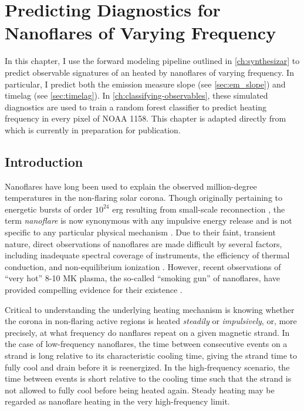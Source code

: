 \chapter{Predicting Diagnostics for Nanoflares of Varying Frequency}\label{ch:modeling-observables}

In this chapter, I use the forward modeling pipeline outlined in \autoref{ch:synthesizar} to predict observable signatures of an \AR{} heated by nanoflares of varying frequency. In particular, I predict both the emission measure slope (see \autoref{sec:em_slope}) and timelag (see \autoref{sec:timelag}). In \autoref{ch:classifying-observables}, these simulated diagnostics are used to train a random forest classifier to predict heating frequency in every pixel of \AR{} NOAA 1158. This chapter is adapted directly from \citet{barnes_understanding_2019} which is currently in preparation for publication. 

\section{Introduction}\label{sec:modeling-observables:introduction}

Nanoflares have long been used to explain the observed million-degree temperatures in the non-flaring solar corona. Though originally pertaining to energetic bursts of order $10^{24}$ erg resulting from small-scale reconnection \citep{parker_nanoflares_1988}, the term \textit{nanoflare} is now synonymous with any impulsive energy release and is not specific to any particular physical mechanism \citep{klimchuk_key_2015}. Due to their faint, transient nature, direct observations of nanoflares are made difficult by several factors, including inadequate spectral coverage of instruments, the efficiency of thermal conduction, and non-equilibrium ionization \citep{cargill_implications_1994,winebarger_defining_2012,barnes_inference_2016}. However, recent observations of ``very hot'' 8-10 MK plasma, the so-called ``smoking gun'' of nanoflares, have provided compelling evidence for their existence \citep[e.g.][]{brosius_pervasive_2014,caspi_new_2015,parenti_spectroscopy_2017,ishikawa_detection_2017}.

Critical to understanding the underlying heating mechanism is knowing whether the corona in non-flaring active regions is heated \textit{steadily} or \textit{impulsively}, or, more precisely, at what frequency do nanflares repeat on a given magnetic strand. In the case of low-frequency nanoflares, the time between consecutive events on a strand is long relative to its characteristic cooling time, giving the strand time to fully cool and drain before it is reenergized. In the high-frequency scenario, the time between events is short relative to the cooling time such that the strand is not allowed to fully cool before being heated again. Steady heating may be regarded as nanoflare heating in the very high-frequency limit.

